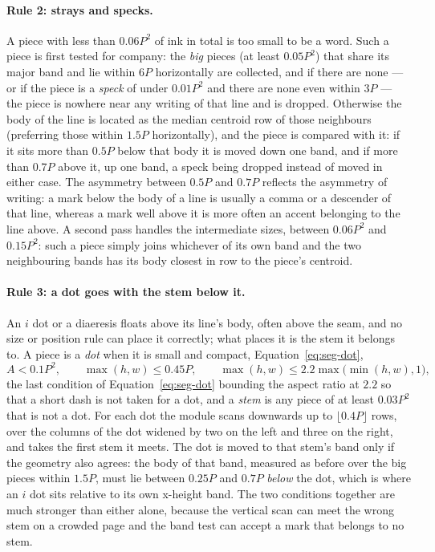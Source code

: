\paragraph{Rule 2: strays and specks.}
A piece with less than $0.06P^2$ of ink in total is too small to be a word.
Such a piece is first tested for company: the \emph{big} pieces (at least $0.05P^2$) that share its major band and lie within $6P$ horizontally are collected, and if there are none --- or if the piece is a \emph{speck} of under $0.01P^2$ and there are none even within $3P$ --- the piece is nowhere near any writing of that line and is dropped.
Otherwise the body of the line is located as the median centroid row of those neighbours (preferring those within $1.5P$ horizontally), and the piece is compared with it: if it sits more than $0.5P$ below that body it is moved down one band, and if more than $0.7P$ above it, up one band, a speck being dropped instead of moved in either case.
The asymmetry between $0.5P$ and $0.7P$ reflects the asymmetry of writing: a mark below the body of a line is usually a comma or a descender of that line, whereas a mark well above it is more often an accent belonging to the line above.
A second pass handles the intermediate sizes, between $0.06P^2$ and $0.15P^2$: such a piece simply joins whichever of its own band and the two neighbouring bands has its body closest in row to the piece's centroid.

\paragraph{Rule 3: a dot goes with the stem below it.}
An $i$ dot or a diaeresis floats above its line's body, often above the seam, and no size or position rule can place it correctly; what places it is the stem it belongs to.
A piece is a \emph{dot} when it is small and compact, Equation~\ref{eq:seg-dot},
\begin{equation}
A<0.1P^2,\qquad \max(h,w)\le0.45P,\qquad \max(h,w)\le2.2\max\bigl(\min(h,w),1\bigr),
\label{eq:seg-dot}
\end{equation}
the last condition of Equation~\ref{eq:seg-dot} bounding the aspect ratio at $2.2$ so that a short dash is not taken for a dot, and a \emph{stem} is any piece of at least $0.03P^2$ that is not a dot.
For each dot the module scans downwards up to $\lfloor0.4P\rfloor$ rows, over the columns of the dot widened by two on the left and three on the right, and takes the first stem it meets.
The dot is moved to that stem's band only if the geometry also agrees: the body of that band, measured as before over the big pieces within $1.5P$, must lie between $0.25P$ and $0.7P$ \emph{below} the dot, which is where an $i$ dot sits relative to its own x-height band.
The two conditions together are much stronger than either alone, because the vertical scan can meet the wrong stem on a crowded page and the band test can accept a mark that belongs to no stem.


